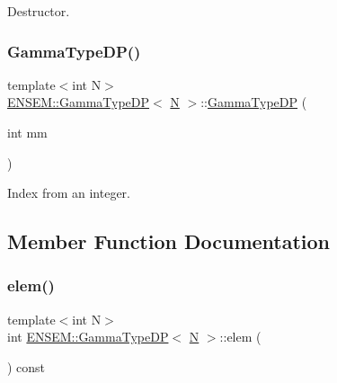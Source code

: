 Destructor. 

\mbox{\label{classENSEM_1_1GammaTypeDP_a6a31946a6e7bde24f7bae87f6cfd2add}} 
\subsubsection{\texorpdfstring{GammaTypeDP()}{GammaTypeDP()}\hspace{0.1cm}{\footnotesize\ttfamily [4/4]}}
{\footnotesize\ttfamily template$<$int N$>$ \\
\mbox{\hyperlink{classENSEM_1_1GammaTypeDP}{E\+N\+S\+E\+M\+::\+Gamma\+Type\+DP}}$<$ \mbox{\hyperlink{operator__name__util_8cc_a7722c8ecbb62d99aee7ce68b1752f337}{N}} $>$\+::\mbox{\hyperlink{classENSEM_1_1GammaTypeDP}{Gamma\+Type\+DP}} (\begin{DoxyParamCaption}\item[{int}]{mm }\end{DoxyParamCaption})\hspace{0.3cm}{\ttfamily [inline]}}



Index from an integer. 



\subsection{Member Function Documentation}
\mbox{\label{classENSEM_1_1GammaTypeDP_a0d7ad0581feda4578c3ee7631ce730e2}} 
\subsubsection{\texorpdfstring{elem()}{elem()}\hspace{0.1cm}{\footnotesize\ttfamily [1/2]}}
{\footnotesize\ttfamily template$<$int N$>$ \\
int \mbox{\hyperlink{classENSEM_1_1GammaTypeDP}{E\+N\+S\+E\+M\+::\+Gamma\+Type\+DP}}$<$ \mbox{\hyperlink{operator__name__util_8cc_a7722c8ecbb62d99aee7ce68b1752f337}{N}} $>$\+::elem (\begin{DoxyParamCaption}{ }\end{DoxyParamCaption}) const\hspace{0.3cm}{\ttfamily [inline]}}



